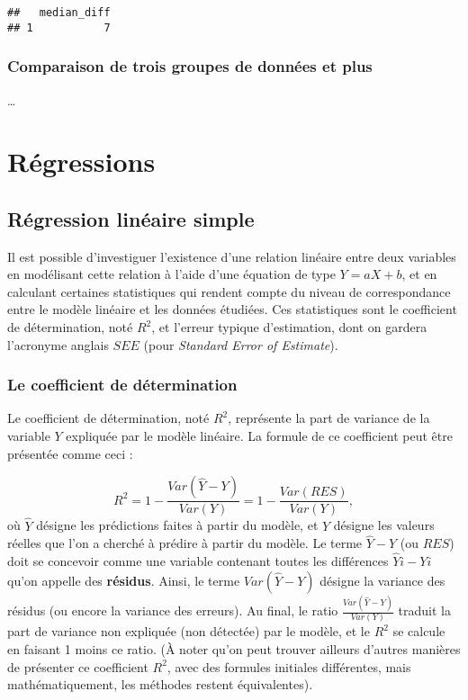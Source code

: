 \documentclass[
]{book}
\begin{document}
\begin{verbatim}
##   median_diff
## 1           7
\end{verbatim}

\hypertarget{comparaison-de-trois-groupes-de-donnuxe9es-et-plus}{%
\subsection{Comparaison de trois groupes de données et plus}\label{comparaison-de-trois-groupes-de-donnuxe9es-et-plus}}

\ldots{}

\hypertarget{ruxe9gressions}{%
\chapter{Régressions}\label{ruxe9gressions}}

\hypertarget{ruxe9gression-linuxe9aire-simple}{%
\section{Régression linéaire simple}\label{ruxe9gression-linuxe9aire-simple}}

Il est possible d'investiguer l'existence d'une relation linéaire entre deux variables en modélisant cette relation à l'aide d'une équation de type \(Y = aX + b\), et en calculant certaines statistiques qui rendent compte du niveau de correspondance entre le modèle linéaire et les données étudiées. Ces statistiques sont le coefficient de détermination, noté \(R^2\), et l'erreur typique d'estimation, dont on gardera l'acronyme anglais \(SEE\) (pour \emph{Standard Error of Estimate}).

\hypertarget{le-coefficient-de-duxe9termination}{%
\subsection{Le coefficient de détermination}\label{le-coefficient-de-duxe9termination}}

Le coefficient de détermination, noté \(R^2\), représente la part de variance de la variable \(Y\) expliquée par le modèle linéaire. La formule de ce coefficient peut être présentée comme ceci :

\[R^2 = 1 - {\frac {Var(\hat{Y} - Y) } {Var(Y)}} = 1 - {\frac {Var(RES)} {Var(Y)}}, \]
où \(\hat{Y}\) désigne les prédictions faites à partir du modèle, et \(Y\) désigne les valeurs réelles que l'on a cherché à prédire à partir du modèle. Le terme \(\hat{Y} - Y\) (ou \(RES\)) doit se concevoir comme une variable contenant toutes les différences \(\hat{Y}{i} - Y{i}\) qu'on appelle des \textbf{résidus}. Ainsi, le terme \({Var(\hat{Y} - Y) }\) désigne la variance des résidus (ou encore la variance des erreurs). Au final, le ratio \({\frac {Var(\hat{Y} - Y) } {Var(Y)}}\) traduit la part de variance non expliquée (non détectée) par le modèle, et le \(R^2\) se calcule en faisant 1 moins ce ratio. (À noter qu'on peut trouver ailleurs d'autres manières de présenter ce coefficient \(R^2\), avec des formules initiales différentes, mais mathématiquement, les méthodes restent équivalentes).
\end{document}
